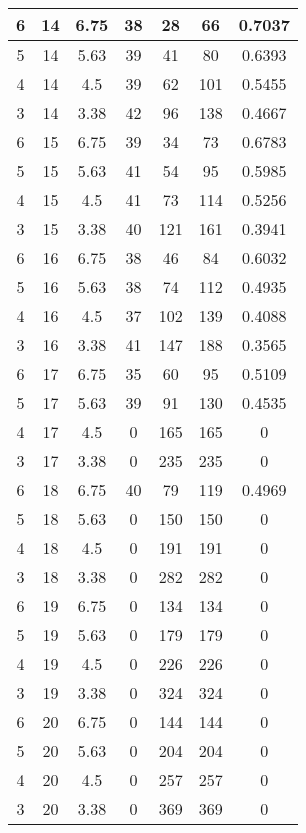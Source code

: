 \documentclass[letterpaper, 12pt]{article}
\begin{document}
\begin{longtable}{|c|c|c|c|c|c|c|}
\hline
6 & 14 & 6.75 & 38 & 28 & 66 & 0.7037 \\
\hline
5 & 14 & 5.63 & 39 & 41 & 80 & 0.6393 \\
\hline
4 & 14 & 4.5 & 39 & 62 & 101 & 0.5455 \\
\hline
3 & 14 & 3.38 & 42 & 96 & 138 & 0.4667 \\
\hline
6 & 15 & 6.75 & 39 & 34 & 73 & 0.6783 \\
\hline
5 & 15 & 5.63 & 41 & 54 & 95 & 0.5985 \\
\hline
4 & 15 & 4.5 & 41 & 73 & 114 & 0.5256 \\
\hline
3 & 15 & 3.38 & 40 & 121 & 161 & 0.3941 \\
\hline
6 & 16 & 6.75 & 38 & 46 & 84 & 0.6032 \\
\hline
5 & 16 & 5.63 & 38 & 74 & 112 & 0.4935 \\
\hline
4 & 16 & 4.5 & 37 & 102 & 139 & 0.4088 \\
\hline
3 & 16 & 3.38 & 41 & 147 & 188 & 0.3565 \\
\hline
6 & 17 & 6.75 & 35 & 60 & 95 & 0.5109 \\
\hline
5 & 17 & 5.63 & 39 & 91 & 130 & 0.4535 \\
\hline
4 & 17 & 4.5 & 0 & 165 & 165 & 0 \\
\hline
3 & 17 & 3.38 & 0 & 235 & 235 & 0 \\
\hline
6 & 18 & 6.75 & 40 & 79 & 119 & 0.4969 \\
\hline
5 & 18 & 5.63 & 0 & 150 & 150 & 0 \\
\hline
4 & 18 & 4.5 & 0 & 191 & 191 & 0 \\
\hline
3 & 18 & 3.38 & 0 & 282 & 282 & 0 \\
\hline
6 & 19 & 6.75 & 0 & 134 & 134 & 0 \\
\hline
5 & 19 & 5.63 & 0 & 179 & 179 & 0 \\
\hline
4 & 19 & 4.5 & 0 & 226 & 226 & 0 \\
\hline
3 & 19 & 3.38 & 0 & 324 & 324 & 0 \\
\hline
6 & 20 & 6.75 & 0 & 144 & 144 & 0 \\
\hline
5 & 20 & 5.63 & 0 & 204 & 204 & 0 \\
\hline
4 & 20 & 4.5 & 0 & 257 & 257 & 0 \\
\hline
3 & 20 & 3.38 & 0 & 369 & 369 & 0 \\
\hline
\end{longtable}
\end{document}
